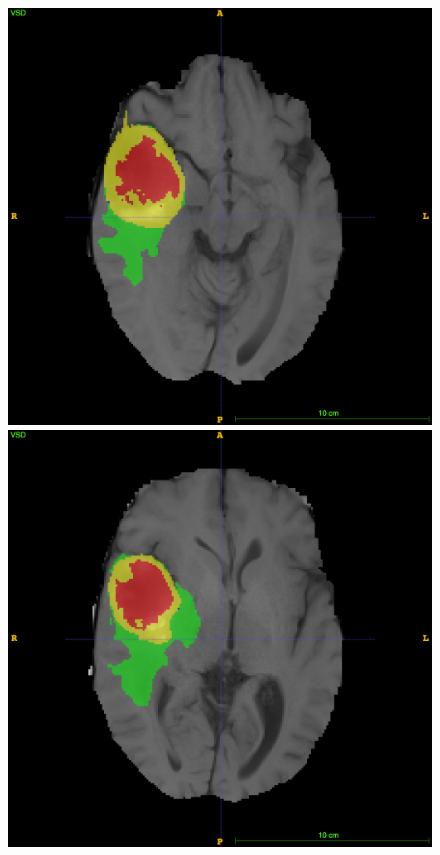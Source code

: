 \documentclass[12pt,a4paper,twoside,openright]{report}
\begin{document}
\begin{figure}
	\includegraphics[scale=0.1]{expert_segmentation_79}
	\includegraphics[scale=0.1]{expert_segmentation_89}

\end{figure}
\end{document}
